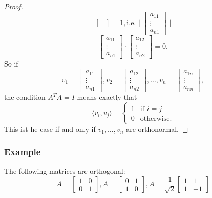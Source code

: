 \documentclass[11pt]{article}
\begin{document}
\begin{proof}
\[\begin{bmatrix}
        \end{bmatrix} = 1, \text{i.e. } \Bigg| \Bigg| \begin{bmatrix}
            a_{11} \\ \vdots \\ a_{n1}
        \end{bmatrix} \Bigg| \Bigg|\] \[\begin{bmatrix}
            a_{11} \\ \vdots \\ a_{n1}
        \end{bmatrix} \cdot \begin{bmatrix}
            a_{12} \\ \vdots \\ a_{n2}
        \end{bmatrix} = 0.\] So if \[v_1 = \begin{bmatrix}
            a_{11} \\ \vdots \\ a_{n1}
        \end{bmatrix}, v_2 = \begin{bmatrix}
            a_{12} \\ \vdots \\ a_{n2}
        \end{bmatrix}, \dots, v_n = \begin{bmatrix}
            a_{1n} \\ \vdots \\ a_{nn}
        \end{bmatrix},\] the condition \(A^T A = I\) means exactly that \[\langle v_i, v_j \rangle = \begin{cases}
            1 & \text{if } i = j \\
            0 & \text{otherwise}.
        \end{cases}\] This ist he case if and only if \(v_1, \dots, v_n\) are orthonormal.
    \end{proof}

    \subsubsection{Example}

    The following matrices are orthogonal: \[A = \begin{bmatrix}
        1 & 0 \\ 0 & 1
    \end{bmatrix}, A = \begin{bmatrix}
        0 & 1 \\ 1 & 0
    \end{bmatrix}, A = \frac{1}{\sqrt{2}} \begin{bmatrix}
        1 & 1 \\ 1 & -1
    \end{bmatrix}\]
\end{document}
